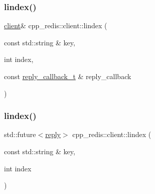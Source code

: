 \mbox{\label{classcpp__redis_1_1client_afa409d5b28466837137dfb12c3554070}} 
\subsubsection{\texorpdfstring{lindex()}{lindex()}\hspace{0.1cm}{\footnotesize\ttfamily [1/2]}}
{\footnotesize\ttfamily \hyperlink{classcpp__redis_1_1client}{client}\& cpp\+\_\+redis\+::client\+::lindex (\begin{DoxyParamCaption}\item[{const std\+::string \&}]{key,  }\item[{int}]{index,  }\item[{const \hyperlink{classcpp__redis_1_1client_a061a1140d36d2eaeda82b09a0bb3f9f2}{reply\+\_\+callback\+\_\+t} \&}]{reply\+\_\+callback }\end{DoxyParamCaption})}

\mbox{\label{classcpp__redis_1_1client_a58458ef30b1fb49584395b6f8584b931}} 
\subsubsection{\texorpdfstring{lindex()}{lindex()}\hspace{0.1cm}{\footnotesize\ttfamily [2/2]}}
{\footnotesize\ttfamily std\+::future$<$\hyperlink{classcpp__redis_1_1reply}{reply}$>$ cpp\+\_\+redis\+::client\+::lindex (\begin{DoxyParamCaption}\item[{const std\+::string \&}]{key,  }\item[{int}]{index }\end{DoxyParamCaption})}

\mbox{\label{classcpp__redis_1_1client_a80799f12e6aafe07872b2bbea453db53}} 

